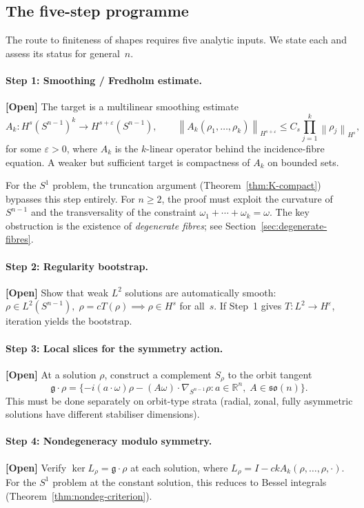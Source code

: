 \documentclass[12pt]{article}
\theoremstyle{definition}
\theoremstyle{remark}
\newcommand{\R}{\mathbb{R}}
\newcommand{\norm}[1]{\left\|#1\right\|}
\newcommand{\open}{\textbf{\color{red}[Open]}}
\begin{document}
\subsection{The five-step programme}

The route to finiteness of shapes requires five analytic inputs.  We state
each and assess its status for general~$n$.

\paragraph{Step 1: Smoothing / Fredholm estimate.}  \open\quad
The target is a multilinear smoothing estimate
\[
  A_k:H^s(S^{n-1})^k\to H^{s+\varepsilon}(S^{n-1}),
  \qquad
  \norm{A_k(\rho_1,\ldots,\rho_k)}_{H^{s+\varepsilon}}
  \leq C_s\prod_{j=1}^k\norm{\rho_j}_{H^s},
\]
for some $\varepsilon>0$, where $A_k$ is the $k$-linear operator behind
the incidence-fibre equation.  A weaker but sufficient target is
compactness of $A_k$ on bounded sets.

For the $S^1$ problem, the truncation argument
(Theorem~\ref{thm:K-compact}) bypasses this step entirely.  For $n\geq 2$,
the proof must exploit the curvature of $S^{n-1}$ and the transversality
of the constraint $\omega_1+\cdots+\omega_k=\omega$.  The key obstruction
is the existence of \emph{degenerate fibres}; see
Section~\ref{sec:degenerate-fibres}.

\paragraph{Step 2: Regularity bootstrap.}  \open\quad
Show that weak $L^2$ solutions are automatically smooth:
$\rho\in L^2(S^{n-1}),\;\rho=cT(\rho)\implies\rho\in H^s$ for all~$s$.
If Step~1 gives $T:L^2\to H^\varepsilon$, iteration yields the bootstrap.

\paragraph{Step 3: Local slices for the symmetry action.}  \open\quad
At a solution $\rho$, construct a complement $S_\rho$ to the orbit tangent
\[
  \mathfrak g\cdot\rho
  = \{-i(a\cdot\omega)\rho-(A\omega)\cdot\nabla_{S^{n-1}}\rho:
  a\in\R^n,\;A\in\mathfrak{so}(n)\}.
\]
This must be done separately on orbit-type strata (radial, zonal, fully
asymmetric solutions have different stabiliser dimensions).

\paragraph{Step 4: Nondegeneracy modulo symmetry.}  \open\quad
Verify $\ker L_\rho=\mathfrak g\cdot\rho$ at each solution, where
$L_\rho=I-ckA_k(\rho,\ldots,\rho,\cdot)$.  For the $S^1$ problem at
the constant solution, this reduces to Bessel integrals
(Theorem~\ref{thm:nondeg-criterion}).
\end{document}

